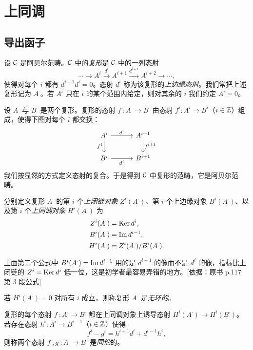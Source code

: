 \section{上同调}
\label{sec:2}

\subsection{导出函子}
\label{sec:2.1}

设 $\mathcal{C}$ 是阿贝尔范畴。$\mathcal{C}$ 中的\emph{复形}是 $\mathcal{C}$ 中的一列态射
\[
\cdots\to A^i\xrightarrow{d^i}A^{i+1}\xrightarrow{d^{i+1}}A^{i+2}\to\cdots,
\]
使得对每个 $i$ 都有 $d^{i+1}d^i=0$。态射 $d^i$ 称为该复形的\emph{上边缘态射}。我们常把上述复形记为 $A^\cdot$。若 $A^i$ 只在 $i$ 的某个范围内给定，则对其余的 $i$ 我们约定 $A^i=0$。

设 $A^\cdot$ 与 $B^\cdot$ 是两个复形。复形的态射 $f^\cdot\colon A^\cdot\to B^\cdot$ 由态射 $f^i\colon A^i\to B^i$（$i\in\mathbb{Z}$）组成，使得下图对每个 $i$ 都交换：
\[\begin{tikzcd}[column sep=3.2em,row sep=1.8em]
A^i \arrow[r,"d^i"] \arrow[d,"f^i"'] & A^{i+1} \arrow[d,"f^{i+1}"] \\
B^i \arrow[r,"d^i"'] & B^{i+1}
\end{tikzcd}\]
我们按显然的方式定义态射的复合。于是得到 $\mathcal{C}$ 中复形的范畴，它是阿贝尔范畴。

分别定义复形 $A^\cdot$ 的第 $i$ 个\emph{上闭链对象} $Z^i(A^\cdot)$、第 $i$ 个上边缘对象 $B^i(A^\cdot)$、以及第 $i$ 个\emph{上同调对象} $H^i(A^\cdot)$ 为
\[
\begin{aligned}
Z^i(A^\cdot)&=\operatorname{Ker} d^i,\\
B^i(A^\cdot)&=\operatorname{Im} d^{i-1},\\
H^i(A^\cdot)&=Z^i(A^\cdot)/B^i(A^\cdot).
\end{aligned}
\]
\begin{tnote}
上面第二个公式中 $B^i(A^\cdot)=\operatorname{Im} d^{i-1}$ 用的是 $d^{i-1}$ 的像而不是 $d^i$ 的像，指标比上闭链的 $Z^i=\operatorname{Ker} d^i$ 低一位，这是初学者最容易弄错的地方。[依据：原书 p.117 第 3 段公式]
\end{tnote}
若 $H^i(A^\cdot)=0$ 对所有 $i$ 成立，则称复形 $A^\cdot$ 是\emph{无环的}。

复形的每个态射 $f^\cdot\colon A^\cdot\to B^\cdot$ 都在上同调对象上诱导态射 $H^i(A^\cdot)\to H^i(B^\cdot)$。若存在态射 $h^i\colon A^i\to B^{i-1}$（$i\in\mathbb{Z}$）使得
\[
f^i-g^i=h^{i+1}d^i+d^{i-1}h^i,
\]
则称两个态射 $f^\cdot,g^\cdot\colon A^\cdot\to B^\cdot$ 是\emph{同伦}的。

